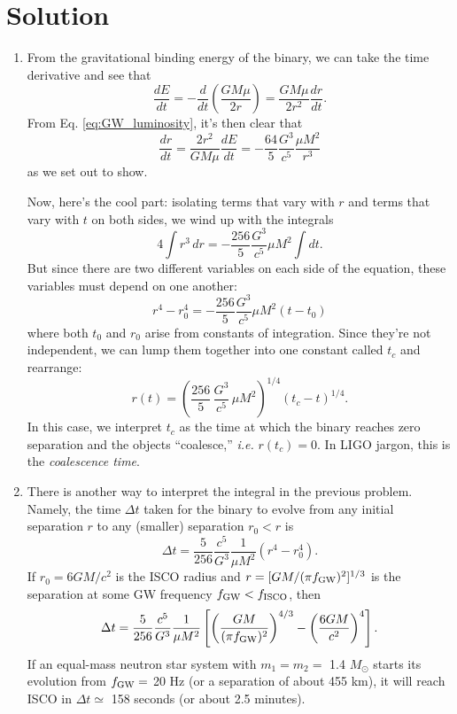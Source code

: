 \documentclass[11pt]{article}
\begin{document}
\section*{Solution}

\begin{enumerate}

\item From the gravitational binding energy of the binary, we can take the time derivative and see that
\[ \frac{dE}{dt} = -\frac{d}{dt}\left(\frac{GM\mu}{2r}\right) = \frac{GM\mu}{2r^2} \frac{dr}{dt}. \]
From Eq. \ref{eq:GW_luminosity}, it's then clear that
\[ \frac{dr}{dt} = \frac{2r^2}{GM\mu} \frac{dE}{dt} = - \frac{64}{5} \frac{G^3}{c^5} \frac{\mu M^2}{r^3} \]
as we set out to show.

\hspace{15pt} Now, here's the cool part: isolating terms that vary with $r$ and terms that vary with $t$ on both sides, we wind up with the integrals
\[ 4 \int r^3 \, dr = - \frac{256}{5} \frac{G^3}{c^5} \mu M^2 \int dt. \]
But since there are two different variables on each side of the equation, these variables must depend on one another:
\[ r^4 - r_0^4 = - \frac{256}{5} \frac{G^3}{c^5} \mu M^2 \left(t - t_0\right) \]
where both $t_0$ and $r_0$ arise from constants of integration. Since they're not independent, we can lump them together into one constant called $t_c$ and rearrange:
\begin{equation}\label{eq:roft}
r(t) = \left( \frac{256}{5}\,\frac{G^3}{c^5}\,\mu M^2 \right)^{1/4} \left(t_c - t\right)^{1/4}.
\end{equation}
In this case, we interpret $t_c$ as the time at which the binary reaches zero separation and the objects ``coalesce,'' \textit{i.e.} $r(t_c) = 0$. In LIGO jargon, this is the \textit{coalescence time}.

\item There is another way to interpret the integral in the previous problem. Namely, the time $\Delta t$ taken for the binary to evolve from any initial separation $r$ to any (smaller) separation $r_0 < r$ is
\[ \Delta t = \frac{5}{256} \frac{c^5}{G^3} \frac{1}{\mu M^2} \left(r^4 - r_0^4\right). \]
If $r_0 = 6GM/c^2$ is the ISCO radius and $r = [GM/(\pi f_{\rm GW})^2]^{1/3}$ is the separation at some GW frequency $f_{\rm GW} < f_{\rm ISCO}$, then
\[ \Delta t = \frac{5}{256} \frac{c^5}{G^3} \frac{1}{\mu M^2} \left[\left(\frac{GM}{(\pi f_{\rm GW})^2}\right)^{4/3} - \left(\frac{6GM}{c^2}\right)^4\right]. \]
If an equal-mass neutron star system with $m_1=m_2=$ 1.4 $M_{\odot}$ starts its evolution from $f_{\rm GW}=$ 20 Hz (or a separation of about 455 km), it will reach ISCO in $\Delta t \simeq$ 158 seconds (or about 2.5 minutes).


\end{enumerate}
\end{document}
